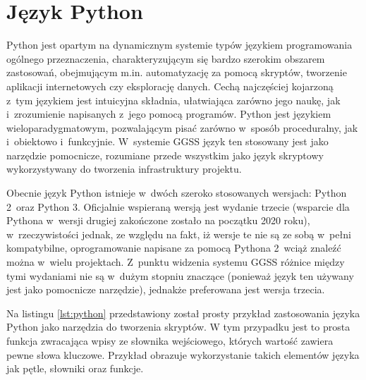\section{Język Python}
Python \cite{Python_main} \cite{Lutz} jest opartym na dynamicznym systemie typów językiem programowania ogólnego przeznaczenia, charakteryzującym się bardzo szerokim obszarem zastosowań, obejmującym m.in. automatyzację za pomocą skryptów, tworzenie aplikacji internetowych czy eksplorację danych. Cechą najczęściej kojarzoną z~tym językiem jest intuicyjna składnia, ułatwiająca zarówno jego naukę, jak i~zrozumienie napisanych z~jego pomocą programów. Python jest językiem wieloparadygmatowym, pozwalającym pisać zarówno w~sposób proceduralny, jak i~obiektowo i~funkcyjnie. W~systemie GGSS język ten stosowany jest jako narzędzie pomocnicze, rozumiane przede wszystkim jako język skryptowy wykorzystywany do tworzenia infrastruktury projektu.

Obecnie język Python istnieje w~dwóch szeroko stosowanych wersjach: Python 2~oraz Python 3. Oficjalnie wspieraną wersją jest wydanie trzecie (wsparcie dla Pythona w~wersji drugiej zakończone zostało na początku 2020 roku), w~rzeczywistości jednak, ze względu na fakt, iż wersje te nie są ze sobą w~pełni kompatybilne, oprogramowanie napisane za pomocą Pythona 2~wciąż znaleźć można w~wielu projektach. Z~punktu widzenia systemu GGSS różnice między tymi wydaniami nie są w~dużym stopniu znaczące (ponieważ język ten używany jest jako pomocnicze narzędzie), jednakże preferowana jest wersja trzecia.

Na listingu \ref{lst:python} przedstawiony został prosty przykład zastosowania języka Python jako narzędzia do tworzenia skryptów. W tym przypadku jest to prosta funkcja zwracająca wpisy ze słownika wejściowego, których wartość zawiera pewne słowa kluczowe. Przykład obrazuje wykorzystanie takich elementów języka jak pętle, słowniki oraz funkcje.




